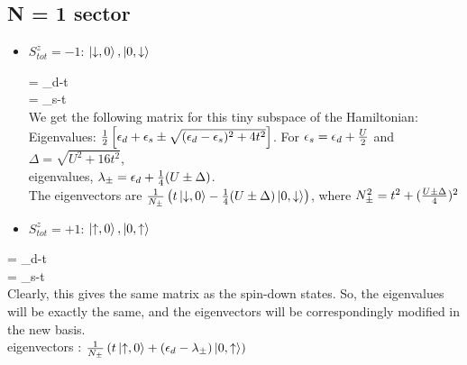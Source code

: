\documentclass[12pt]{article}
\begin{document}
\subsection{N = 1 sector}
\begin{itemize}
\item \(S_{tot}^z = -1\): \(\ket{\downarrow,0}, \ket{0, \downarrow}\)

\beq
\ham{} = \epsilon_d-t \\
\ham{} = \epsilon_s-t \\
\eeq
We get the following matrix for this tiny subspace of the Hamiltonian:
\beq
{}
\eeq
Eigenvalues: \(\frac{1}{2}\left[{\epsilon_d+\epsilon_s \pm \sqrt{(\epsilon_d-\epsilon_s)^2+4t^2}}\right]\). For \(\epsilon_s = \epsilon_d + \frac{U}{2}\) and \(\Delta = \sqrt{U^2+16t^2}\), \\ eigenvalues, \(\lambda_\pm = \epsilon_d + \frac{1}{4}(U\pm\Delta)\). \\
The eigenvectors are \(\frac{1}{N_\pm}\left({t\ket{\downarrow,0}-\frac{1}{4}(U\pm\Delta)\ket{0,\downarrow}}\right)\), where \(N_\pm^2 = t^2 + (\frac{U\pm\Delta}{4})^2\)


\item \(S_{tot}^z = +1\): \(\ket{\uparrow,0}, \ket{0, \uparrow}\)
\end{itemize}

\beq
\ham{} = \epsilon_d-t \\
\ham{} = \epsilon_s-t \\
\eeq
Clearly, this gives the same matrix as the spin-down states. So, the eigenvalues will be exactly the same, and the eigenvectors will be correspondingly modified in the new basis. \\
eigenvectors : \(\frac{1}{N_\pm}\left({t\ket{\uparrow,0}+(\epsilon_d-\lambda_\pm)\ket{0,\uparrow}}\right)\)
\end{document}

